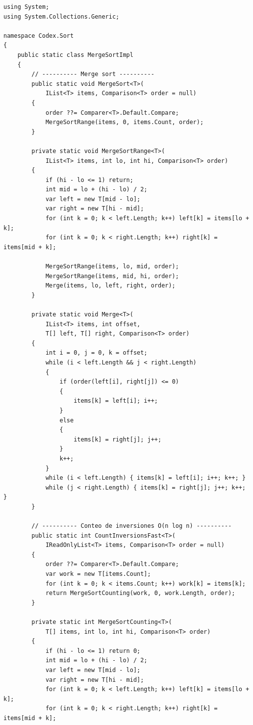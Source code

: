 \documentclass[11pt,a4paper]{article}
\begin{document}
\begin{lstlisting}[caption={\texttt{MergeSort.cs} --- merge sort, conteo de inversiones}]
using System;
using System.Collections.Generic;

namespace Codex.Sort
{
    public static class MergeSortImpl
    {
        // ---------- Merge sort ----------
        public static void MergeSort<T>(
            IList<T> items, Comparison<T> order = null)
        {
            order ??= Comparer<T>.Default.Compare;
            MergeSortRange(items, 0, items.Count, order);
        }

        private static void MergeSortRange<T>(
            IList<T> items, int lo, int hi, Comparison<T> order)
        {
            if (hi - lo <= 1) return;
            int mid = lo + (hi - lo) / 2;
            var left = new T[mid - lo];
            var right = new T[hi - mid];
            for (int k = 0; k < left.Length; k++) left[k] = items[lo + k];
            for (int k = 0; k < right.Length; k++) right[k] = items[mid + k];

            MergeSortRange(items, lo, mid, order);
            MergeSortRange(items, mid, hi, order);
            Merge(items, lo, left, right, order);
        }

        private static void Merge<T>(
            IList<T> items, int offset,
            T[] left, T[] right, Comparison<T> order)
        {
            int i = 0, j = 0, k = offset;
            while (i < left.Length && j < right.Length)
            {
                if (order(left[i], right[j]) <= 0)
                {
                    items[k] = left[i]; i++;
                }
                else
                {
                    items[k] = right[j]; j++;
                }
                k++;
            }
            while (i < left.Length) { items[k] = left[i]; i++; k++; }
            while (j < right.Length) { items[k] = right[j]; j++; k++; }
        }

        // ---------- Conteo de inversiones O(n log n) ----------
        public static int CountInversionsFast<T>(
            IReadOnlyList<T> items, Comparison<T> order = null)
        {
            order ??= Comparer<T>.Default.Compare;
            var work = new T[items.Count];
            for (int k = 0; k < items.Count; k++) work[k] = items[k];
            return MergeSortCounting(work, 0, work.Length, order);
        }

        private static int MergeSortCounting<T>(
            T[] items, int lo, int hi, Comparison<T> order)
        {
            if (hi - lo <= 1) return 0;
            int mid = lo + (hi - lo) / 2;
            var left = new T[mid - lo];
            var right = new T[hi - mid];
            for (int k = 0; k < left.Length; k++) left[k] = items[lo + k];
            for (int k = 0; k < right.Length; k++) right[k] = items[mid + k];


\end{lstlisting}
\end{document}
